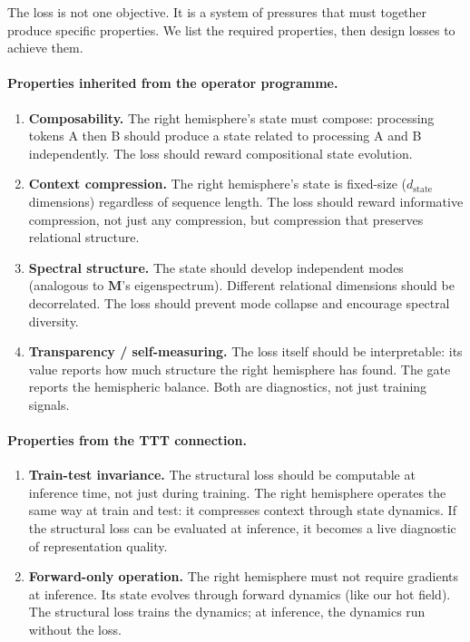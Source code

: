 \documentclass[11pt, a4paper]{article}
\newcommand{\M}{\mathbf{M}}
\theoremstyle{plain}
\theoremstyle{definition}
\theoremstyle{remark}
\begin{document}
The loss is not one objective.
It is a system of pressures that must together produce specific properties.
We list the required properties, then design losses to achieve them.

\paragraph{Properties inherited from the operator programme.}
\begin{enumerate}[nosep]
\item \textbf{Composability.} The right hemisphere's state must compose: processing tokens A then B should produce a state related to processing A and B independently. The loss should reward compositional state evolution.
\item \textbf{Context compression.} The right hemisphere's state is fixed-size ($d_{\mathrm{state}}$ dimensions) regardless of sequence length. The loss should reward informative compression, not just any compression, but compression that preserves relational structure.
\item \textbf{Spectral structure.} The state should develop independent modes (analogous to $\M$'s eigenspectrum). Different relational dimensions should be decorrelated. The loss should prevent mode collapse and encourage spectral diversity.
\item \textbf{Transparency / self-measuring.} The loss itself should be interpretable: its value reports how much structure the right hemisphere has found. The gate reports the hemispheric balance. Both are diagnostics, not just training signals.
\end{enumerate}

\paragraph{Properties from the TTT connection.}
\begin{enumerate}
\item \textbf{Train-test invariance.} The structural loss should be computable at inference time, not just during training. The right hemisphere operates the same way at train and test: it compresses context through state dynamics. If the structural loss can be evaluated at inference, it becomes a live diagnostic of representation quality.
\item \textbf{Forward-only operation.} The right hemisphere must not require gradients at inference. Its state evolves through forward dynamics (like our hot field). The structural loss trains the dynamics; at inference, the dynamics run without the loss.
\end{enumerate}
\end{document}
